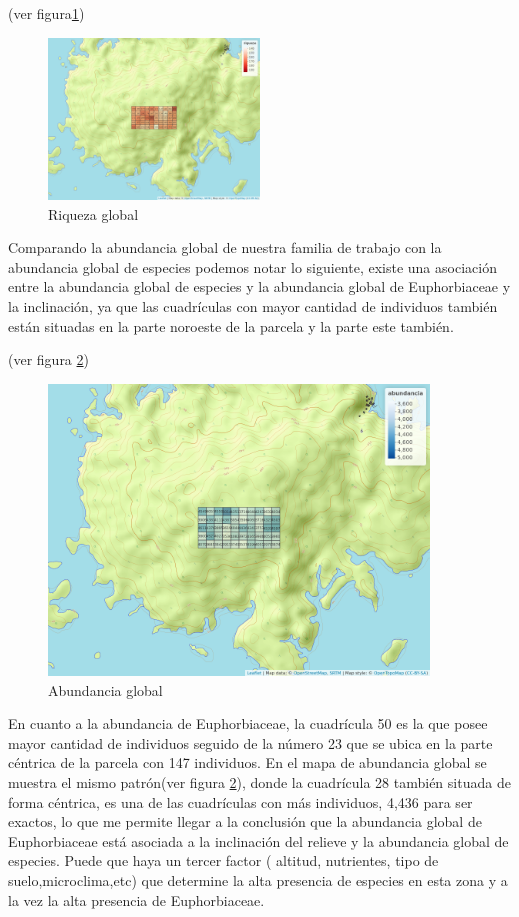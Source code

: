 \documentclass[11pt,]{article}
\begin{document}
(ver figura\ref{fig:cuadro_riqueza_global})

\begin{figure}
\centering
\includegraphics[width=0.50000\textwidth]{mapa_cuadros_riq_global.png}
\caption{\label{fig:cuadro_riqueza_global}Riqueza global}
\end{figure}

Comparando la abundancia global de nuestra familia de trabajo con la
abundancia global de especies podemos notar lo siguiente, existe una
asociación entre la abundancia global de especies y la abundancia global
de Euphorbiaceae y la inclinación, ya que las cuadrículas con mayor
cantidad de individuos también están situadas en la parte noroeste de la
parcela y la parte este también.

(ver figura \ref{fig:cuadro_de_abundancia_global})

\begin{figure}
\centering
\includegraphics[width=0.90000\textwidth]{mapa_cuadros_abun_global.png}
\caption{\label{fig:cuadro_de_abundancia_global}Abundancia global}
\end{figure}

En cuanto a la abundancia de Euphorbiaceae, la cuadrícula 50 es la que
posee mayor cantidad de individuos seguido de la número 23 que se ubica
en la parte céntrica de la parcela con 147 individuos. En el mapa de
abundancia global se muestra el mismo patrón(ver figura
\ref{fig:cuadro_de_abundancia_global}), donde la cuadrícula 28 también
situada de forma céntrica, es una de las cuadrículas con más individuos,
4,436 para ser exactos, lo que me permite llegar a la conclusión que la
abundancia global de Euphorbiaceae está asociada a la inclinación del
relieve y la abundancia global de especies. Puede que haya un tercer
factor ( altitud, nutrientes, tipo de suelo,microclima,etc) que
determine la alta presencia de especies en esta zona y a la vez la alta
presencia de Euphorbiaceae.
\end{document}
